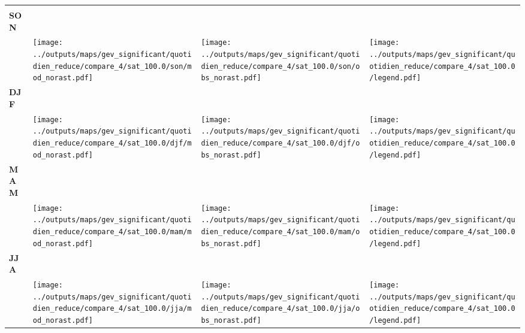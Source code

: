\documentclass[
  letterpaper,
  DIV=11,
  numbers=noendperiod]{scrartcl}
\begin{document}
\begin{longtable*}{m{2.0cm}m{7.9cm}m{7.9cm}m{1cm}}
 & \centering  & \centering  & \tabularnewline
\centering \textbf{SON} \\[0.2em] \begin{tabular}{r@{\hspace{0.2em}}l}\end{tabular} & \centering \texttt{[image: ../outputs/maps/gev\_significant/quotidien\_reduce/compare\_4/sat\_100.0/son/mod\_norast.pdf]} & \centering \texttt{[image: ../outputs/maps/gev\_significant/quotidien\_reduce/compare\_4/sat\_100.0/son/obs\_norast.pdf]} & \centering \texttt{[image: ../outputs/maps/gev\_significant/quotidien\_reduce/compare\_4/sat\_100.0/legend.pdf]} \tabularnewline
\centering \textbf{DJF} \\[0.2em] \begin{tabular}{r@{\hspace{0.2em}}l}\end{tabular} & \centering \texttt{[image: ../outputs/maps/gev\_significant/quotidien\_reduce/compare\_4/sat\_100.0/djf/mod\_norast.pdf]} & \centering \texttt{[image: ../outputs/maps/gev\_significant/quotidien\_reduce/compare\_4/sat\_100.0/djf/obs\_norast.pdf]} & \centering \texttt{[image: ../outputs/maps/gev\_significant/quotidien\_reduce/compare\_4/sat\_100.0/legend.pdf]} \tabularnewline
\centering \textbf{MAM} \\[0.2em] \begin{tabular}{r@{\hspace{0.2em}}l}\end{tabular} & \centering \texttt{[image: ../outputs/maps/gev\_significant/quotidien\_reduce/compare\_4/sat\_100.0/mam/mod\_norast.pdf]} & \centering \texttt{[image: ../outputs/maps/gev\_significant/quotidien\_reduce/compare\_4/sat\_100.0/mam/obs\_norast.pdf]} & \centering \texttt{[image: ../outputs/maps/gev\_significant/quotidien\_reduce/compare\_4/sat\_100.0/legend.pdf]} \tabularnewline
\centering \textbf{JJA} \\[0.2em] \begin{tabular}{r@{\hspace{0.2em}}l}\end{tabular} & \centering \texttt{[image: ../outputs/maps/gev\_significant/quotidien\_reduce/compare\_4/sat\_100.0/jja/mod\_norast.pdf]} & \centering \texttt{[image: ../outputs/maps/gev\_significant/quotidien\_reduce/compare\_4/sat\_100.0/jja/obs\_norast.pdf]} & \centering \texttt{[image: ../outputs/maps/gev\_significant/quotidien\_reduce/compare\_4/sat\_100.0/legend.pdf]} \tabularnewline
\end{longtable*}
\end{document}
